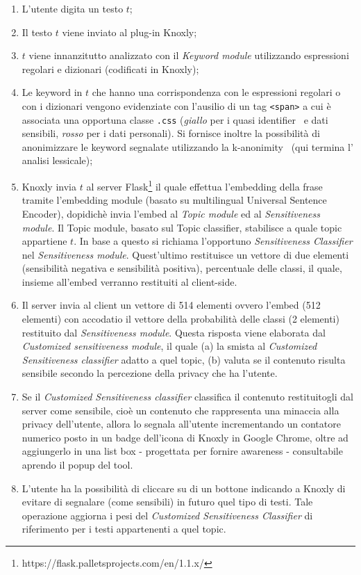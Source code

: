 \begin{enumerate}
    \item L'utente digita un testo $t$;
    \item Il testo $t$ viene inviato al plug-in Knoxly;
    \item $t$ viene innanzitutto analizzato con il \textit{Keyword module} utilizzando espressioni regolari e dizionari (codificati in Knoxly);
    \item Le keyword in $t$ che hanno una corrispondenza con le espressioni regolari o con i dizionari vengono evidenziate con l'ausilio di un tag {\tt <span>} a cui è associata una opportuna classe {\tt .css} (\textit{giallo} per i quasi identifier~\cite{quasiID} e dati sensibili, \textit{rosso} per i dati personali). Si fornisce inoltre la possibilità di anonimizzare le keyword segnalate utilizzando la k-anonimity~\cite{kAnonimity} (qui termina l' analisi lessicale);
    \item Knoxly invia $t$ al server Flask\footnote{https://flask.palletsprojects.com/en/1.1.x/} il quale effettua l'embedding della frase tramite l'embedding module (basato su multilingual Universal Sentence Encoder), dopidichè invia l'embed al \textit{Topic module} ed al \textit{Sensitiveness module}. Il Topic module, basato sul Topic classifier, stabilisce a quale topic appartiene $t$. In base a questo si richiama l'opportuno \textit{Sensitiveness Classifier} nel \textit{Sensitiveness module}. Quest'ultimo restituisce un vettore di due elementi (sensibilità negativa e sensibilità positiva), percentuale delle classi,  il quale, insieme all'embed verranno restituiti al client-side.
    \item Il server invia al client un vettore di 514 elementi ovvero l'embed (512 elementi) con accodatio il vettore della probabilità delle classi (2 elementi) restituito dal \textit{Sensitiveness module}. Questa risposta viene elaborata dal \textit{Customized sensitiveness module}, il quale (a) la smista al \textit{Customized Sensitiveness classifier} adatto a quel topic, (b) valuta se il contenuto risulta sensibile secondo la percezione della privacy che ha l'utente.
    \item Se il \textit{Customized Sensitiveness classifier} classifica il contenuto restituitogli dal server come sensibile, cioè un contenuto che rappresenta una minaccia alla privacy dell'utente, allora lo segnala all'utente incrementando un contatore numerico posto in un badge dell'icona di Knoxly in Google Chrome, oltre ad aggiungerlo in una list box - progettata per fornire awareness - consultabile aprendo il popup del tool.
    \item L'utente ha la possibilità di cliccare su di un bottone  indicando a Knoxly di evitare di segnalare (come sensibili) in futuro quel tipo di testi. Tale operazione aggiorna i pesi del \textit{Customized Sensitiveness Classifier} di riferimento per i testi appartenenti a quel topic.
\end{enumerate}

